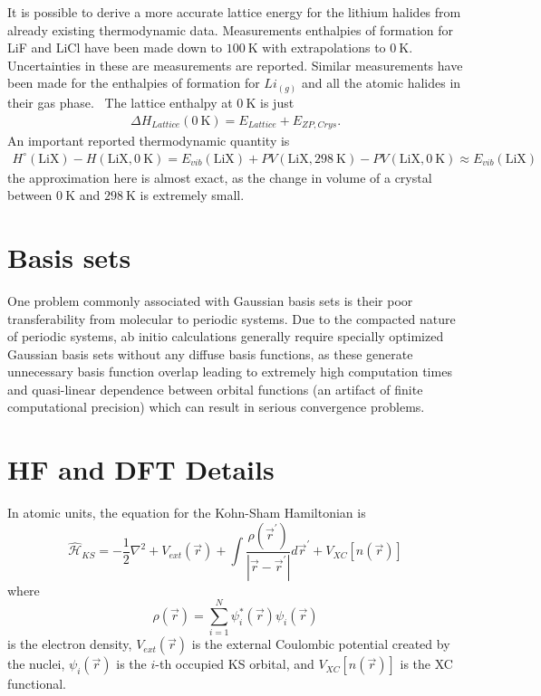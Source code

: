 \documentclass[titlepage,11pt]{article}
\newcommand{\Ham}{\widehat{\mathcal{H}}}
\begin{document}
It is possible to derive a more accurate lattice energy for the lithium halides from already existing thermodynamic data. Measurements enthalpies of formation for LiF and LiCl have been made down to $\SI{100}{\kelvin}$ with extrapolations to $\SI{0}{\kelvin}$.~\cite{chase1998nist} Uncertainties in these are measurements are reported. Similar measurements have been made for the enthalpies of formation for $Li_{(g)}$ and all the atomic halides in their gas phase.~\cite{chase1998nist,cox1984codata} The lattice enthalpy at $\SI{0}{\kelvin}$ is just
\begin{align}
\Delta H_{Lattice} (\SI{0}{\kelvin}) = E_{Lattice} + E_{ZP,Crys}.
\end{align}
An important reported thermodynamic quantity is 
\begin{align}
H^{\circ} (\text{LiX}) - H (\text{LiX}, \SI{0}{\kelvin}) = E_{vib}(\text{LiX}) + PV (\text{LiX},\SI{298}{\kelvin}) - PV (\text{LiX},\SI{0}{\kelvin}) \approx E_{vib}(\text{LiX})
\end{align}
the approximation here is almost exact, as the change in volume of a crystal between $\SI{0}{\kelvin}$ and $\SI{298}{\kelvin}$ is extremely small.



\section{Basis sets}

One problem commonly associated with Gaussian basis sets is their poor transferability from molecular to periodic systems. Due to the compacted nature of periodic systems, ab initio calculations generally require specially optimized Gaussian basis sets without any diffuse basis functions, as these generate unnecessary basis function overlap leading to extremely high computation times and quasi-linear dependence between orbital functions (an artifact of finite computational precision) which can result in serious convergence problems.

\section{HF and DFT Details}

In atomic units, the equation for the Kohn-Sham Hamiltonian is
\begin{equation}
\Ham_{KS} = -\frac{1}{2} \nabla^{2} + V_{ext}(\vec{r}) + \int \frac{\rho(\vec{r}^{\prime})}{|\vec{r} - \vec{r}^{\prime}|}d\vec{r}^{\prime} + V_{XC}[n(\vec{r})]
\end{equation}
where
\begin{equation}
\rho(\vec{r}) = \sum_{i=1}^{N} \psi_{i}^{*}(\vec{r}) \psi_{i}(\vec{r})
\end{equation}
is the electron density, $V_{ext}(\vec{r})$ is the external Coulombic potential created by the nuclei, $\psi_{i}(\vec{r})$ is the $i$-th occupied KS orbital, and $V_{XC}[n(\vec{r})]$ is the XC functional.
\end{document}

